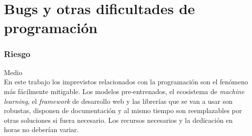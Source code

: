 \section{Bugs y otras dificultades de programación}
\subsubsection{Riesgo} Medio\\
En este trabajo los imprevistos relacionados con la programación son el fenómeno
más fácilmente mitigable. Los modelos pre-entrenados, el ecosistema de \textit{machine learning},
el \textit{framework} de desarrollo web y las librerías que se van a usar son robustas,
disponen de documentación y al mismo tiempo son reemplazables por otras soluciones si fuera necesario.
Los recursos necesarios y la dedicación en horas no deberían variar.
